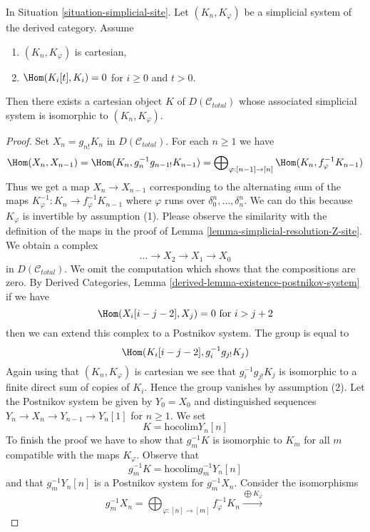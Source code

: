 \begin{lemma}
\label{lemma-cartesian-object-derived-from-simplicial}
In Situation \ref{situation-simplicial-site}. Let
$(K_n, K_\varphi)$ be a simplicial system of the derived category.
Assume
\begin{enumerate}
\item $(K_n, K_\varphi)$ is cartesian,
\item $\Hom(K_i[t], K_i) = 0$ for $i \geq 0$ and $t > 0$.
\end{enumerate}
Then there exists a cartesian object $K$ of $D(\mathcal{C}_{total})$
whose associated simplicial system is isomorphic to $(K_n, K_\varphi)$.
\end{lemma}

\begin{proof}
Set $X_n = g_{n!}K_n$ in $D(\mathcal{C}_{total})$. For each $n \geq 1$
we have
$$
\Hom(X_n, X_{n - 1}) =
\Hom(K_n, g_n^{-1}g_{n - 1!}K_{n - 1}) =
\bigoplus\nolimits_{\varphi : [n - 1] \to [n]}
\Hom(K_n, f_\varphi^{-1}K_{n - 1})
$$
Thus we get a map $X_n \to X_{n - 1}$ corresponding to the
alternating sum of the maps
$K_\varphi^{-1} : K_n \to f_\varphi^{-1}K_{n - 1}$
where $\varphi$ runs over $\delta^n_0, \ldots, \delta^n_n$.
We can do this because $K_\varphi$ is invertible by assumption (1).
Please observe the similarity with the definition of the maps
in the proof of Lemma \ref{lemma-simplicial-resolution-Z-site}.
We obtain a complex
$$
\ldots \to X_2 \to X_1 \to X_0
$$
in $D(\mathcal{C}_{total})$. We omit the computation which shows
that the compositions are zero. By
Derived Categories, Lemma \ref{derived-lemma-existence-postnikov-system}
if we have
$$
\Hom(X_i[i - j - 2], X_j) = 0\text{ for }i > j + 2
$$
then we can extend this complex to a Postnikov system.
The group is equal to
$$
\Hom(K_i[i - j - 2], g_i^{-1}g_{j!}K_j)
$$
Again using that $(K_n, K_\varphi)$ is cartesian we see that
$g_i^{-1}g_{j!}K_j$ is isomorphic to a finite direct sum of copies of
$K_i$. Hence the group vanishes by assumption (2).
Let the Postnikov system be given by $Y_0 = X_0$ and distinguished
sequences $Y_n \to X_n \to Y_{n - 1} \to Y_n[1]$ for $n \geq 1$.
We set
$$
K = \text{hocolim} Y_n[n]
$$
To finish the proof we have to show that $g_m^{-1}K$ is isomorphic
to $K_m$ for all $m$ compatible with the maps $K_\varphi$. Observe that
$$
g_m^{-1} K = \text{hocolim} g_m^{-1}Y_n[n]
$$
and that $g_m^{-1}Y_n[n]$ is a Postnikov system for $g_m^{-1}X_n$.
Consider the isomorphisms
$$
g_m^{-1}X_n =
\bigoplus\nolimits_{\varphi : [n] \to [m]} f_\varphi^{-1}K_n
\xrightarrow{\bigoplus K_\varphi}
$$
\end{proof}

